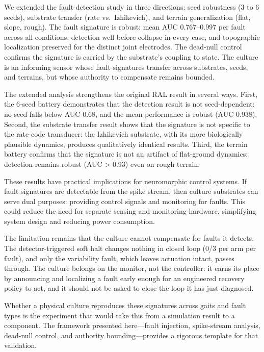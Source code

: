 We extended the fault-detection study in three directions: seed robustness (3 to
6 seeds), substrate transfer (rate vs.\ Izhikevich), and terrain generalization
(flat, slope, rough). The fault signature is robust: mean AUC 0.767--0.997 per
fault across all conditions, detection well before collapse in every case, and
topographic localization preserved for the distinct joint electrodes. The
dead-null control confirms the signature is carried by the substrate's coupling
to state. The culture is an informing sensor whose fault signatures transfer
across substrates, seeds, and terrains, but whose authority to compensate
remains bounded.

The extended analysis strengthens the original RAL result in several ways.
First, the 6-seed battery demonstrates that the detection result is not
seed-dependent: no seed falls below AUC 0.68, and the mean performance is
robust (AUC 0.938). Second, the substrate transfer result shows that the
signature is not specific to the rate-code transducer: the Izhikevich
substrate, with its more biologically plausible dynamics, produces
qualitatively identical results. Third, the terrain battery confirms that the
signature is not an artifact of flat-ground dynamics: detection remains robust
(AUC > 0.93) even on rough terrain.

These results have practical implications for neuromorphic control systems.
If fault signatures are detectable from the spike stream, then culture
substrates can serve dual purposes: providing control signals and monitoring
for faults. This could reduce the need for separate sensing and monitoring
hardware, simplifying system design and reducing power consumption.

The limitation remains that the culture cannot compensate for faults it
detects. The detector-triggered soft halt changes nothing in closed loop
(0/3 per arm per fault), and only the variability fault, which leaves
actuation intact, passes through. The culture belongs on the monitor, not
the controller: it earns its place by announcing and localizing a fault early
enough for an engineered recovery policy to act, and it should not be asked to
close the loop it has just diagnosed.

Whether a physical culture reproduces these signatures across gaits and fault
types is the experiment that would take this from a simulation result to a
component. The framework presented here---fault injection, spike-stream
analysis, dead-null control, and authority bounding---provides a rigorous
template for that validation.

